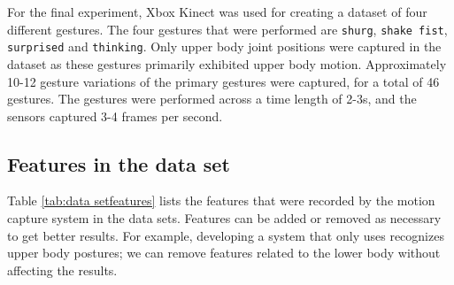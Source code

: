 \documentclass[]{report}   %
\begin{document}
For the final experiment, Xbox Kinect was used for creating a dataset of four different gestures. The four gestures that were performed are \texttt{shurg}, \texttt{shake fist}, \texttt{surprised} and \texttt{thinking}. Only upper body joint positions were captured in the dataset as these gestures primarily exhibited upper body motion. Approximately 10-12 gesture variations of the primary gestures were captured, for a total of 46 gestures. The gestures were performed across a time length of 2-3s, and the sensors captured 3-4 frames per second. 

\subsection*{Features in the data set}
Table \ref{tab:data setfeatures} lists the features that were recorded by the motion capture system in the data sets. Features can be added or removed as necessary to get better results. For example, developing a system that only uses recognizes upper body postures; we can remove features related to the lower body without affecting the results.
\end{document}
